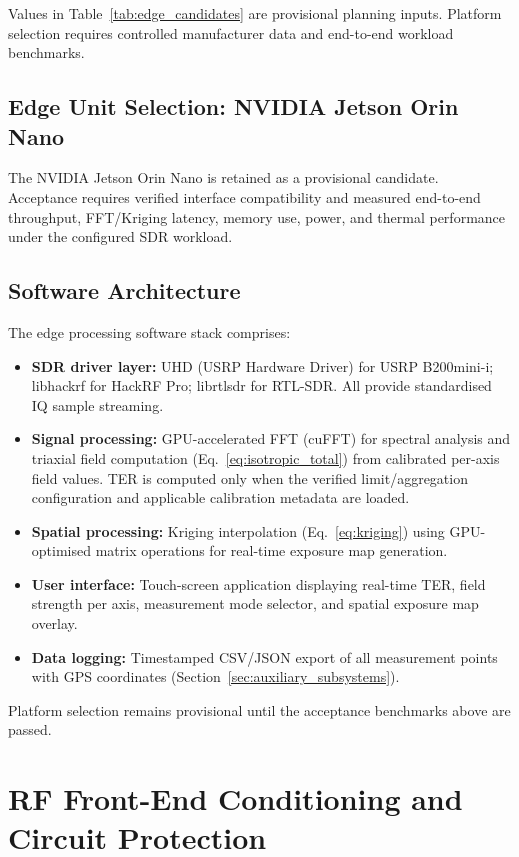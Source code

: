 \documentclass[11pt,a4paper]{article}
\begin{document}
\noindent Values in Table~\ref{tab:edge_candidates} are provisional planning inputs. Platform selection requires controlled manufacturer data and end-to-end workload benchmarks.

\subsection{Edge Unit Selection: NVIDIA Jetson Orin Nano}

The NVIDIA Jetson Orin Nano is retained as a provisional candidate. Acceptance requires verified interface compatibility and measured end-to-end throughput, FFT/Kriging latency, memory use, power, and thermal performance under the configured SDR workload.

\subsection{Software Architecture}

The edge processing software stack comprises:

\begin{itemize}
    \item \textbf{SDR driver layer:} UHD (USRP Hardware Driver) for USRP B200mini-i; libhackrf for HackRF Pro; librtlsdr for RTL-SDR. All provide standardised IQ sample streaming.
    \item \textbf{Signal processing:} GPU-accelerated FFT (cuFFT) for spectral analysis and triaxial field computation (Eq.~\ref{eq:isotropic_total}) from calibrated per-axis field values. TER is computed only when the verified limit/aggregation configuration and applicable calibration metadata are loaded.
    \item \textbf{Spatial processing:} Kriging interpolation (Eq.~\ref{eq:kriging}) using GPU-optimised matrix operations for real-time exposure map generation.
    \item \textbf{User interface:} Touch-screen application displaying real-time TER, field strength per axis, measurement mode selector, and spatial exposure map overlay.
    \item \textbf{Data logging:} Timestamped CSV/JSON export of all measurement points with GPS coordinates (Section~\ref{sec:auxiliary_subsystems}).
\end{itemize}

\noindent Platform selection remains provisional until the acceptance benchmarks above are passed.

\section{RF Front-End Conditioning and Circuit Protection}
\label{sec:rf_frontend}
\end{document}
